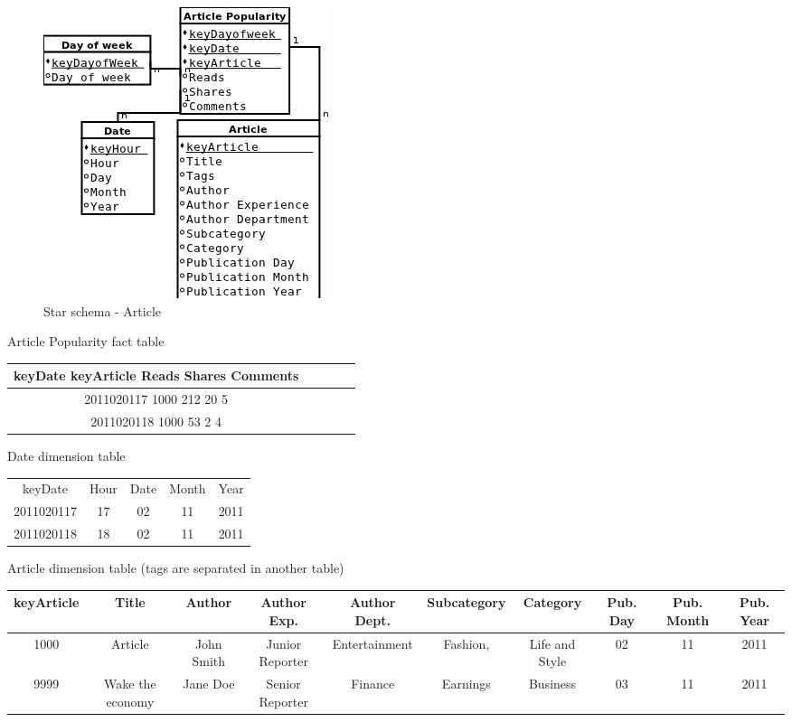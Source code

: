 \begin{figure}[!hbp]
    \includegraphics[scale=0.5]{schema_star_article}
\caption{\label{pic:st_art}  Star schema - Article}
\end{figure}

Article Popularity fact table\\
\begin{tabular}{|c|c|c|c|c|}
\hline
keyDate keyArticle Reads Shares Comments\\
\hline
2011020117 1000 212 20 5\\
2011020118 1000 53 2 4\\
\hline
\end{tabular}

Date dimension table\\
\begin{tabular}{|c|c|c|c|c|}
\hline
keyDate         & Hour & Date & Month & Year\\
2011020117 & 17 & 02 & 11 & 2011\\
2011020118 & 18 & 02 & 11 & 2011\\
\hline
\end{tabular}


Article dimension table (tags are separated in another table)\\
\begin{tabular}{|c|c|c|c|c|c|c|c|c|c|}
\hline
keyArticle & Title & Author & Author Exp. & Author Dept. & Subcategory & Category & Pub. Day & Pub. Month & Pub. Year\\
\hline
1000 & Article  & John Smith & Junior Reporter & Entertainment & Fashion, & Life and Style & 02 & 11 & 2011\\
9999 & Wake the economy & Jane Doe & Senior Reporter & Finance & Earnings & Business & 03 & 11 & 2011\\
\hline
\end{tabular}

\clearpage


